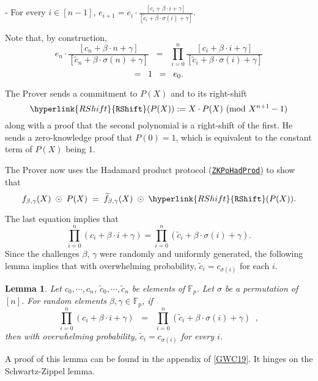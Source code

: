 \documentclass[11pt, lettersize, notitlepage, leqno, footskip=0.6cm]{article}
\newcommand{\bFp}{\mathbb{F}_p}
\newcommand{\wti}{\widetilde}
\newcommand{\be}{\beta}
\newcommand{\vs}{\vspace{-0.15cm}}
\newcommand{\noin}{\noindent}
\newcommand{\op}{overwhelming probability}
\newcommand{\Mod}[1]{\ (\mathrm{mod}\ #1)}
\newtheorem{Lem}[Thm]{Lemma}
\numberwithin{equation}{section}
\begin{document}
\noin - For every $i\in [n-1]$, $e_{i+1} = e_{i}\cdot \frac{[{c_i+\be\cdot i +\gamma}]}{ [{\wti{c}_i+\be\cdot \sigma(i) +\gamma}]}$. \vspace{2mm}

\noin Note that, by construction, \vs $$e_n\cdot \frac{[{c_n+\be\cdot n +\gamma}]}{ [{\wti{c}_n+\be\cdot \sigma(n) +\gamma}]}\;\; = \;\;\prod\limits_{i=0}^n  \frac{[{c_i+\be\cdot i +\gamma}]}{ [{\wti{c}_i+\be\cdot \sigma(i) +\gamma}]} $$ \vspace{-3mm} $$ = \;\;1 \;\;=\;\; e_0. \vs  $$

\noin The Prover sends a commitment to $P(X)$ and to its right-shift  $$\hyperlink{RShift}{{\tt{RShift}}}(P(X)):= X\cdot P(X)\Mod{X^{n+1}-1} $$ along with a proof that the second polynomial is a right-shift of the first. He sends a zero-knowledge proof that $P(0) = 1$, which is equivalent to the constant term of $P(X)$ being $1$.

The Prover now uses the Hadamard product protocol (\hyperlink{HadProd}{\tt{ZKPoHadProd}}) to show that \vs $$f_{\be,\gamma}(X)\;\odot\; P(X) \;=\; \wti{f}_{\be,\gamma}(X) \;\odot\; \hyperlink{RShift}{{\tt{RShift}}}(P(X)).   $$

\noin The last equation implies that 
\vs $$ \prod\limits_{i=0}^n (c_i+\be\cdot i + \gamma) = \prod\limits_{i=0}^n (\wti{c}_i+\be\cdot \sigma(i) + \gamma). $$ Since the challenges $\be$, $\gamma$ were randomly and uniformly generated, the following lemma implies that with \op, $\wti{c}_i = c_{\sigma(i)}$ for each $i$.



\begin{Lem} Let $c_0,\cdots,c_n$, $\wti{c}_0,\cdots,\wti{c}_n$ be elements of $\bFp$. Let $\sigma$ be a permutation of $[n]$. For random elements $\be,\gamma\in \bFp$, if \vs $$ \prod\limits_{i=0}^n (c_i+\be\cdot i + \gamma)\;\; =\;\; \prod\limits_{i=0}^n (\wti{c}_i+\be\cdot \sigma(i) + \gamma)\;\;, $$ then with \op, $\wti{c}_i = c_{\sigma(i)}$ for every $i$. \end{Lem}

\noin A proof of this lemma can be found in the appendix of \hyperlink{PLONK}{[GWC19]}. It hinges on the Schwartz-Zippel lemma.
\end{document}
